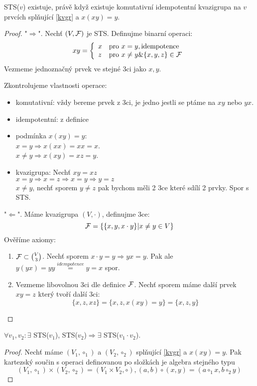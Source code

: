 \begin{theorem}
    STS($v$) existuje, právě když existuje komutativní idempotentní kvazigrupa na $v$ prvcích splňující \cref{kvgr} a $x(xy)=y$.
\end{theorem}
\begin{proof}
	"$\Rightarrow$". Nechť $(V, \operatorname{\mathcal{F}})$ je STS.
	Definujme binarní operaci:
	\[ xy = \left\{ \begin{array}{ll} x & \mbox{pro }  x = y, \text{idempotence} \\ z & \mbox{pro } x \ne y \& \{ x, y, z\} \in \operatorname{\mathcal{F}} \end{array} \right. \]
	Vezmeme jednoznačný prvek ve stejné 3ci jako $x, y$.

	Zkontrolujeme vlastnosti operace:
    	\begin{itemize}
    	    \item komutativní: vždy bereme prvek z 3ci, je jedno jestli se ptáme na $xy$ nebo $yx$.
    	    \item idempotentní: z definice
	    \item podmínka $x(xy)=y$:\\
		    $x = y \Rightarrow x(xx) = xx = x$.\\
		    $x \ne y \Rightarrow x(xy) = xz = y$.
	    \item kvazigrupa: Nechť $xy = xz$ \\
		    $ x = y \Rightarrow x = z \Rightarrow x = y \Rightarrow y = z$\\
		    $x \ne y$, nechť sporem $y \ne z$ pak bychom měli 2 3ce které sdílí 2 prvky.
		    Spor s STS.
    	\end{itemize}

	"$\Leftarrow$". Máme kvazigrupa $(V, \cdot)$, definujme 3ce:
	\[ \operatorname{\mathcal{F}} = \{ \{ x, y , x\cdot y \} | x \ne y \in V \} \]
	Ověříme axiomy:
	\begin{enumerate}
		\item $\operatorname{\mathcal{F}} \subset \binom{V}{3}$. Nechť sporem $x\cdot y = y \Rightarrow yx = y$.
			Pak ale $y(yx) = yy \stackrel{idempotence}{=} y = x$ spor.
		\item Vezmeme libovolnou 3ci dle definice $\operatorname{\mathcal{F}}$.
			Nechť sporem máme další prvek $xy = z$ který tvoří další 3ci:
			\[ \{ x, z, xz \} = \{ x, z, x(xy) = y \} = \{ x, z, y \} \]
	\end{enumerate}
\end{proof}
\begin{theorem}
    $\forall v_1,v_2: \exists$ STS($v_1$), STS($v_2$)$\Rightarrow\exists$ STS($v_1\cdot v_2$).
\end{theorem}
\begin{proof}
	Nechť máme $(V_1, \circ_1)$ a $(V_2, \circ_2)$ splňující \cref{kvgr} a $x(xy)=y$.
	Pak kartezský součin s operaci definovanou po složkách je algebra stejného typu
	\[ (V_1, \circ_1) \times (V_2, \circ_2) = (V_1 \times V_2, \circ), (a, b) \circ (x, y) = (a \circ_1 x, b \circ_2 y) \]
\end{proof}

